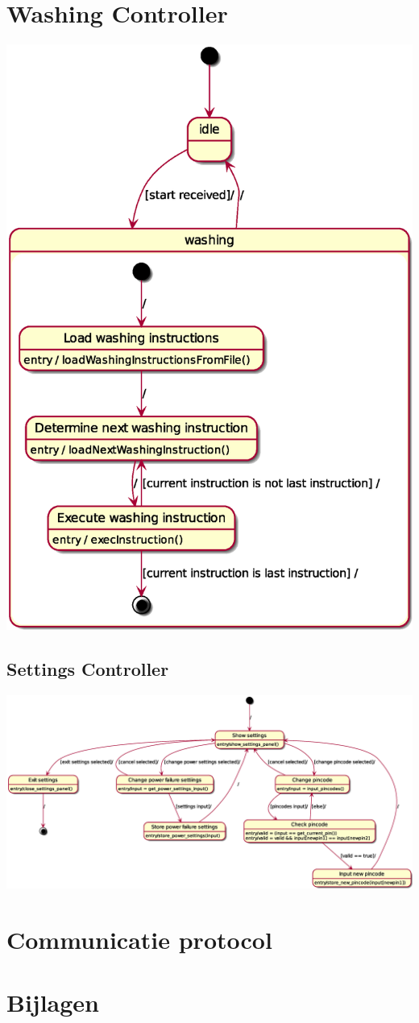 		\section{Washing Controller}
		\includegraphics[scale=0.4]{washing_controller.eps}

		\begin{landscape}
			\thispagestyle{empty}
			\section{Settings Controller}
			\includegraphics[scale=0.5]{settings_controller.eps}
		\end{landscape}

\section{Communicatie protocol}


\section{Bijlagen}
